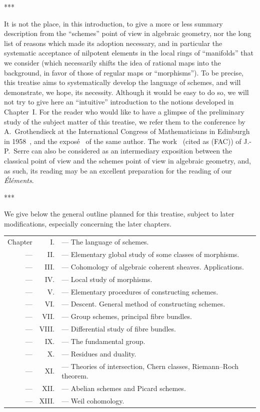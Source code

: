 \documentclass[openany,oneside]{amsbook}
\theoremstyle{ega-env-style}
\theoremstyle{ega-thm-env-style}
\theoremstyle{ega-defn-env-style}
\newcommand{\oldpage}[2][]{{\marginnote{\normalfont{\textbf{#1}~|~#2}}}\ignorespaces}
\def\sectionbreak{\begin{center}***\end{center}}
\begin{document}
\sectionbreak

It is not the place, in this introduction, to give a more or less summary description from the ``schemes'' point of view in algebraic geometry, nor the long list of reasons which made its adoption necessary, and in particular the systematic acceptance of nilpotent elements in the local rings of ``manifolds'' that we consider (which necessarily shifts the idea of rational maps into the background, in favor of those of regular maps or ``morphisms'').
To be precise, this treatise aims to systematically develop the language of schemes, and will demonstrate, we hope, its necessity.
Although it would be easy to do so,
\oldpage[I]{6}
we will not try to give here an ``intuitive'' introduction to the notions developed in Chapter~I.
For the reader who would like to have a glimpse of the preliminary study of the subject matter of this treatise, we refer them to the conference by A.~Grothendieck at the International Congress of Mathematicians in Edinburgh in 1958~\cite{I-7}, and the expos\'e~\cite{I-8} of the same author.
The work~\cite{I-14} (cited as (FAC)) of J.-P.~Serre can also be considered as an intermediary exposition between the classical point of view and the schemes point of view in algebraic geometry, and, as such, its reading may be an excellent preparation for the reading of our \emph{\'El\'ements}.

\sectionbreak

We give below the general outline planned for this treatise, subject to later modifications, especially concerning the later chapters.

\begin{tabular}{rrl}
Chapter & I. & --- The language of schemes.\\
--- & II. & --- Elementary global study of some classes of morphisms.\\
--- & III. & --- Cohomology of algebraic coherent sheaves. Applications.\\
--- & IV. & --- Local study of morphisms.\\
--- & V. & --- Elementary procedures of constructing schemes.\\
--- & VI. & --- Descent. General method of constructing schemes.\\
--- & VII. & --- Group schemes, principal fibre bundles.\\
--- & VIII. & --- Differential study of fibre bundles.\\
--- & IX. & --- The fundamental group.\\
--- & X. & --- Residues and duality.\\
--- & XI. & --- Theories of intersection, Chern classes,
Riemann--Roch theorem.\\
--- & XII. & --- Abelian schemes and Picard schemes.\\
--- & XIII. & --- Weil cohomology.
\end{tabular}\\
\end{document}
